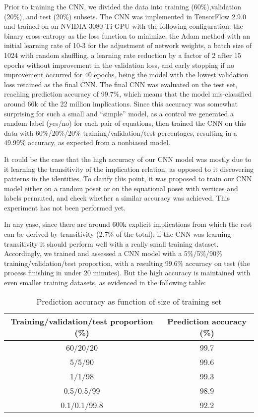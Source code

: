 \smallskip

Prior to training the CNN, we divided the data into training (60\%),validation (20\%), and test (20\%) subsets. The CNN was implemented in TensorFlow 2.9.0\cite{tensorflow2015-whitepaper} and trained on an NVIDIA 3080 Ti GPU with the following configuration: the binary cross-entropy as the loss function to minimize, the Adam method with an initial learning rate of 10-3 for the adjustment of network weights, a batch size of 1024 with random shuffling, a learning rate reduction by a factor of 2 after 15 epochs without improvement in the validation loss, and early stopping if no improvement occurred for 40 epochs, being the model with the lowest validation loss retained as the final CNN.
The final CNN was evaluated on the test set, reaching prediction accuracy of 99.7\%, which means that the model mis-classified around 66k of the 22 million implications. Since this accuracy was somewhat surprising for such a small and “simple” model, as a control we generated a random label (yes/no) for each pair of equations, then trained the CNN on this data with 60\%/20\%/20\% training/validation/test percentages, resulting in a 49.99\% accuracy, as expected from a nonbiased model.

\smallskip

It could be the case that the high accuracy of our CNN model was mostly due to it learning the transitivity of the implication relation, as opposed to it discovering patterns in the identities. To clarify this point, it was proposed to train our CNN model either on a random poset or on the equational poset with vertices and labels permuted, and check whether a similar accuracy was achieved. This experiment has not been performed yet.

\smallskip

In any case, since there are around 600k explicit implications from which the rest can be derived by transitivity (2.7\% of the total), if the CNN was learning transitivity it should perform well with a really small training dataset. Accordingly, we trained and assessed a CNN model with a 5\%/5\%/90\% training/validation/test proportion, with a resulting 99.6\% accuracy on test (the process finishing in under 20 minutes). But the high accuracy is maintained with even smaller training datasets, as evidenced in the following table:
\begin{table}[h]
\centering
\begin{tabular}{|c|c|}
\hline
  \textbf{Training/validation/test proportion (\%)} & \textbf{Prediction accuracy (\%)} \\\hline\hline
  60/20/20 & 99.7 \\\hline
  5/5/90 & 99.6 \\\hline
  1/1/98 & 99.3 \\\hline
  0.5/0.5/99 & 98.9 \\\hline
  0.1/0.1/99.8 & 92.2 \\
  \hline
\end{tabular}
\caption{Prediction accuracy as function of size of training set}
\end{table}

